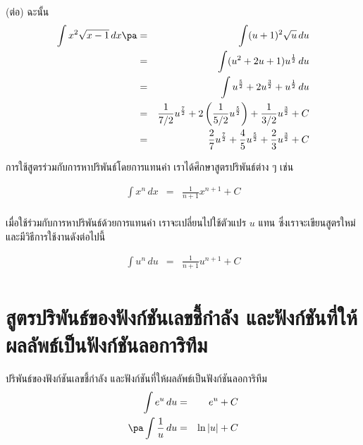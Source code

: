 \begin{frame}
\begin{sol} (ต่อ)
ฉะนั้น
\begin{eqnarray*}
\int x^2 \sqrt{x-1}\, dx \pa &=& \int (u+1)^2 \sqrt{u} \, du \\
&=& \int (u^2+2u+1) u^{\frac{1}{2}} \, du \\
&=& \int u^{\frac{5}{2}} + 2u^{\frac{3}{2}} + u^{\frac{1}{2}} \, du \\
&=& \frac{1}{7/2} u^{\frac{7}{2}} + 2 \left(\frac{1}{5/2} u^{\frac{5}{2}}\right) + \frac{1}{3/2} u^{\frac{3}{2}} + C \\
&=& \frac{2}{7} u^{\frac{7}{2}} + \frac{4}{5} u^{\frac{5}{2}} + \frac{2}{3} u^{\frac{3}{2}} + C \\
\end{eqnarray*}
\end{sol}
\end{frame}


\begin{frame}{การใช้สูตรร่วมกับการหาปริพันธ์โดยการแทนค่า}
เราได้ศึกษาสูตรปริพันธ์ต่าง ๆ เช่น
\begin{remark}{}
\begin{eqnarray*}
\int x^n \, dx &=& \frac{1}{n+1}x^{n+1} + C \\
\end{eqnarray*}
\end{remark}
เมื่อใช้ร่วมกับการหาปริพันธ์ด้วยการแทนค่า เราจะเปลี่ยนไปใช้ตัวแปร $u$ แทน ซึ่งเราจะเขียนสูตรใหม่ และมีวิธีการใช้งานดังต่อไปนี้
\begin{remark}{}
\begin{eqnarray*}
\int u^n \, du &=& \frac{1}{n+1}u^{n+1} + C \\
\end{eqnarray*}
\end{remark}
\end{frame}

\section[เลขชี้กำลังและลอการิทึม]{สูตรปริพันธ์ของฟังก์ชันเลขชี้กำลัง และฟังก์ชันที่ให้ผลลัพธ์เป็นฟังก์ชันลอการิทึม}
\frame{\sectionpage}


\begin{frame}
\begin{thm}{ปริพันธ์ของฟังก์ชันเลขชี้กำลัง และฟังก์ชันที่ให้ผลลัพธ์เป็นฟังก์ชันลอการิทึม}{}
\begin{eqnarray*}
\int e^u \, du &=& e^u + C \\ \pa
\int \frac{1}{u} \, du &=& \ln |u| + C
\end{eqnarray*}
\end{thm}
\end{frame}

